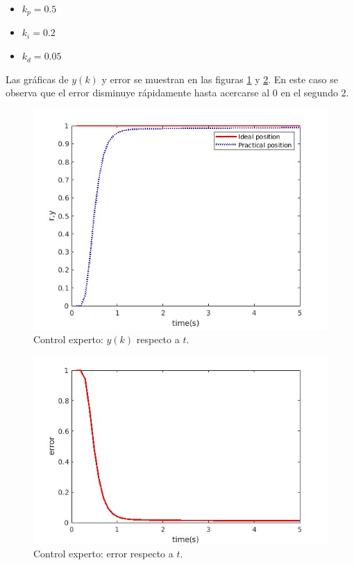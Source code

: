 \documentclass{article}
\begin{document}
\begin{itemize}
\item $k_p = 0.5$
\item $k_i = 0.2$
\item $k_d = 0.05$
\end{itemize}

Las gráficas de $y(k)$ y error se muestran en las figuras \ref{experto_y} y \ref{experto_error}. En este caso se observa que el error disminuye rápidamente hasta acercarse al 0 en el segundo 2.

\begin{figure}
\center
\includegraphics[scale=0.5]{expy.jpg}
\caption{Control experto: $y(k)$ respecto a $t$.}
\label{experto_y}
\end{figure}

\begin{figure}
\center
\includegraphics[scale=0.5]{exp_error.jpg}
\caption{Control experto: error respecto a $t$.}
\label{experto_error}
\end{figure}
\end{document}
